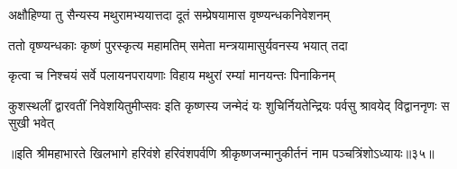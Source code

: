 \twolineshloka
{अक्षौहिण्या तु सैन्यस्य मथुरामभ्ययात्तदा}
{दूतं सम्प्रेषयामास वृष्ण्यन्धकनिवेशनम्} %

\twolineshloka
{ततो वृष्ण्यन्धकाः कृष्णं पुरस्कृत्य महामतिम्}
{समेता मन्त्रयामासुर्यवनस्य भयात् तदा} %

\twolineshloka
{कृत्वा च निश्चयं सर्वे पलायनपरायणाः}
{विहाय मथुरां रम्यां मानयन्तः पिनाकिनम्} %

\threelineshloka
{कुशस्थलीं द्वारवतीं निवेशयितुमीप्सवः}
{इति कृष्णस्य जन्मेदं यः शुचिर्नियतेन्द्रियः}
{पर्वसु श्रावयेद् विद्वाननृणः स सुखी भवेत्} %

॥इति श्रीमहाभारते खिलभागे हरिवंशे हरिवंशपर्वणि श्रीकृष्णजन्मानुकीर्तनं नाम पञ्चत्रिंशोऽध्यायः॥३५॥